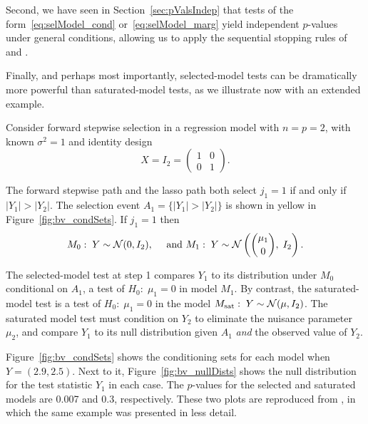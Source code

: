 \documentclass{article}
\begin{document}
Second, we have seen in Section~\ref{sec:pValsIndep} that tests of the form~\eqref{eq:selModel_cond} or~\eqref{eq:selModel_marg} yield independent $p$-values under general conditions, allowing us to apply  the sequential stopping rules of~\citet{gsell2013sequential} and \citet{li2015accumulation}.

Finally, and perhaps most importantly, selected-model tests can be dramatically more powerful than saturated-model tests, as we illustrate now with an extended example.

\begin{example}\label{ex:bivariate}
  Consider forward stepwise selection in a regression model with $n=p=2$, with known $\sigma^2=1$ and identity design 
\[
X = I_2=\begin{pmatrix} 1 & 0 \\ 0 & 1\end{pmatrix}.
\] 

The forward stepwise path and the lasso path both select $j_1=1$ if and only if $|Y_1|>|Y_2|$. The selection event $A_1=\{|Y_1| > |Y_2|\}$ is shown in yellow in Figure~\ref{fig:bv_condSets}. If $j_1=1$ then
\[
M_0:\; Y\sim \mathcal{N}(0,I_2), \quad\text{ and } 
M_1:\; Y \sim \mathcal{N}\left(\binom{\mu_1}{0}, \; I_2\right).
\]

The selected-model test at step 1 compares $Y_1$ to its distribution under $M_0$ conditional on $A_1$, a test of $H_0:\;\mu_1=0$ in model $M_1$. By contrast, the saturated-model test is a test of $H_0:\; \mu_1=0$ in the model $M_{\text{sat}}:\; Y \sim \mathcal{N}(\mu, I_2)$. The saturated model test must condition on $Y_2$ to eliminate the nuisance parameter $\mu_2$, and compare $Y_1$ to its null distribution given $A_1$ {\em and} the observed value of $Y_2$.

Figure~\ref{fig:bv_condSets} shows the conditioning sets for each model when $Y=(2.9, 2.5)$. Next to it, Figure~\ref{fig:bv_nullDists} shows the null distribution for the test statistic $Y_1$ in each case. The $p$-values for the selected and saturated models are 0.007 and 0.3, respectively. These two plots are reproduced from \citet{fithian2014optimal}, in which the same example was presented in less detail.
\end{example}
\end{document}
